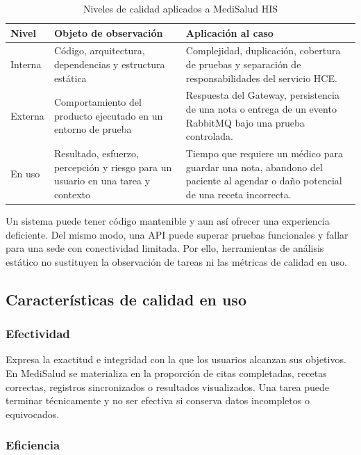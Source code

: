 \begin{table}[H]
\centering
\caption{Niveles de calidad aplicados a MediSalud HIS}
\begin{tabularx}{\textwidth}{p{2.6cm}YY}
\toprule
\textbf{Nivel} & \textbf{Objeto de observación} & \textbf{Aplicación al caso} \\
\midrule
Interna & Código, arquitectura, dependencias y estructura estática & Complejidad, duplicación, cobertura de pruebas y separación de responsabilidades del servicio HCE. \\
Externa & Comportamiento del producto ejecutado en un entorno de prueba & Respuesta del Gateway, persistencia de una nota o entrega de un evento RabbitMQ bajo una prueba controlada. \\
En uso & Resultado, esfuerzo, percepción y riesgo para un usuario en una tarea y contexto & Tiempo que requiere un médico para guardar una nota, abandono del paciente al agendar o daño potencial de una receta incorrecta. \\
\bottomrule
\end{tabularx}
\end{table}

Un sistema puede tener código mantenible y aun así ofrecer una experiencia deficiente. Del mismo modo, una API puede superar pruebas funcionales y fallar para una sede con conectividad limitada. Por ello, herramientas de análisis estático no sustituyen la observación de tareas ni las métricas de calidad en uso.

\subsection{Características de calidad en uso}

\subsubsection{Efectividad}

Expresa la exactitud e integridad con la que los usuarios alcanzan sus objetivos. En MediSalud se materializa en la proporción de citas completadas, recetas correctas, registros sincronizados o resultados visualizados. Una tarea puede terminar técnicamente y no ser efectiva si conserva datos incompletos o equivocados.

\subsubsection{Eficiencia}

